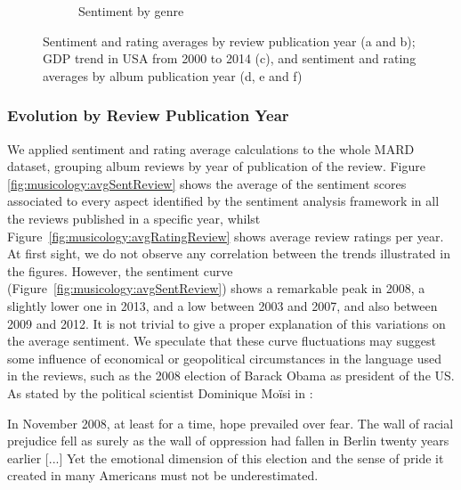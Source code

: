 \begin{figure}[ht!]
\begin{subfigure}{.3\textwidth}
        \caption{Sentiment by genre}
        \label{fig:musicology:avgSentimentGenresRelease}
    \end{subfigure}
    \caption{Sentiment and rating averages by review publication year (a and b); GDP trend in USA from 2000 to 2014 (c), and sentiment and rating averages by album publication year (d, e and f)}
\end{figure}

\subsubsection{Evolution by Review Publication Year}

We applied sentiment and rating average calculations to the whole MARD dataset, grouping album reviews by year of publication of the review. Figure \ref{fig:musicology:avgSentReview} shows the average of the sentiment scores associated to every aspect identified by the sentiment analysis framework in all the reviews published in a specific year, whilst Figure~\ref{fig:musicology:avgRatingReview} shows average review ratings per year. At first sight, we do not observe any correlation between the trends illustrated in the figures. However, the sentiment curve (Figure~\ref{fig:musicology:avgSentReview}) shows a remarkable peak in 2008, a slightly lower one in 2013, and a low between 2003 and 2007, and also between 2009 and 2012. %
It is not trivial to give a proper explanation of this variations on the average sentiment. We speculate that these curve fluctuations may suggest some influence of economical or geopolitical circumstances in the language used in the reviews, such as the 2008 election of Barack Obama as president of the US. As stated by the political scientist Dominique Mo\"{i}si in \cite{Moisi2010}:

\begin{displayquote}\small{
In November 2008, at least for a time, hope prevailed over fear. The wall of racial prejudice fell as surely as the wall of oppression had fallen in Berlin twenty years earlier [...] Yet the emotional dimension of this election and the sense of pride it created in many Americans must not be underestimated.}
\end{displayquote}


